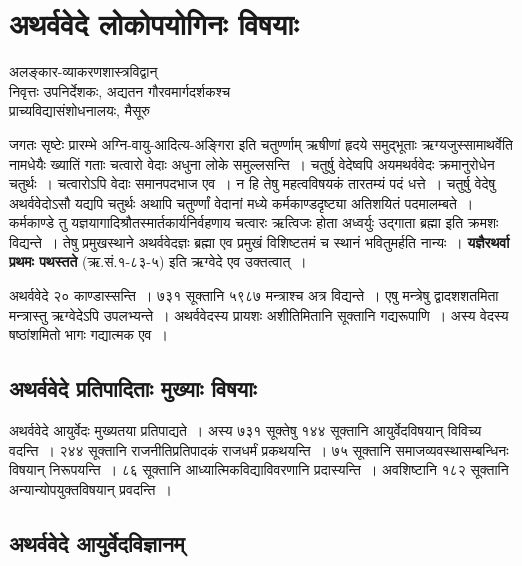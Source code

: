 {\fontsize{15}{17}\selectfont
\presetvalues
\chapter{अथर्ववेदे लोकोपयोगिनः विषयाः}

\begin{center}
\smallskip

अलङ्कार-व्याकरणशास्त्रविद्वान्\\ 
निवृत्तः उपनिर्देशकः, अद्यतन गौरवमार्गदर्शकश्च \\ प्राच्यविद्यासंशोधनालयः, मैसूरु
\addrule
\end{center}
\vskip -10pt

जगतः सृष्टेः प्रारम्भे अग्नि-वायु-आदित्य-अङ्गिरा इति चतुर्ण्णाम् ऋषीणां हृदये समुद्भूताः ऋग्यजुस्सामाथर्वेति नामधेयैः ख्यातिं गताः चत्वारो वेदाः अधुना लोके समुल्लसन्ति~। चतुर्षु वेदेष्वपि अयमथर्ववेदः क्रमानुरोधेन चतुर्थः~। चत्वारोऽपि वेदाः समानपदभाज एव~। न हि तेषु महत्वविषयकं तारतम्यं पदं धत्ते~। चतुर्षु वेदेषु अथर्ववेदोऽसौ यद्यपि चतुर्थः अथापि चतुर्ण्णां वेदानां मध्ये कर्मकाण्डदृष्ट्या अतिशयितं पदमालम्बते~। कर्मकाण्डे तु यज्ञयागादिश्रौतस्मार्तकार्यनिर्वहणाय चत्वारः ऋत्विजः होता अध्वर्युः उद्गाता ब्रह्मा इति क्रमशः विद्यन्ते~। तेषु प्रमुखस्थाने अथर्ववेदज्ञः ब्रह्मा एव प्रमुखं विशिष्टतमं च स्थानं भवितुमर्हति नान्यः~। \textbf{यज्ञैरथर्वा प्रथमः पथस्तते} (ऋ.सं.१-८३-५) इति ऋग्वेदे एव उक्तत्वात्~। 

अथर्ववेदे २० काण्डास्सन्ति~। ७३१ सूक्तानि ५९८७ मन्त्राश्च अत्र विद्यन्ते~। एषु मन्त्रेषु द्वादशशतमिता मन्त्रास्तु ऋग्वेदेऽपि उपलभ्यन्ते~। अथर्ववेदस्य प्रायशः अशीतिमितानि सूक्तानि गद्यरूपाणि~। अस्य वेदस्य षष्ठांशमितो भागः गद्यात्मक एव~। 

\section*{अथर्ववेदे प्रतिपादिताः मुख्याः विषयाः}

अथर्ववेदे आयुर्वेदः मुख्यतया प्रतिपाद्यते~। अस्य ७३१ सूक्तेषु १४४ सूक्तानि आयुर्वेदविषयान् विविच्य वदन्ति~। २४४ सूक्तानि राजनीतिप्रतिपादकं राजधर्मं प्रकथयन्ति~। ७५ सूक्तानि समाजव्यवस्थासम्बन्धिनः विषयान् निरूपयन्ति~। ८६ सूक्तानि आध्यात्मिकविद्याविवरणानि प्रदास्यन्ति~। अवशिष्टानि १८२ सूक्तानि अन्यान्योपयुक्तविषयान् प्रवदन्ति~। 

\section*{अथर्ववेदे आयुर्वेदविज्ञानम्}

}
